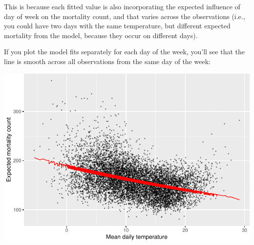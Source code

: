 \documentclass[
]{book}
\newenvironment{Shaded}{\begin{snugshade}}{\end{snugshade}}
\newcommand{\AttributeTok}[1]{\textcolor[rgb]{0.77,0.63,0.00}{#1}}
\newcommand{\FloatTok}[1]{\textcolor[rgb]{0.00,0.00,0.81}{#1}}
\newcommand{\FunctionTok}[1]{\textcolor[rgb]{0.00,0.00,0.00}{#1}}
\newcommand{\NormalTok}[1]{#1}
\newcommand{\SpecialCharTok}[1]{\textcolor[rgb]{0.00,0.00,0.00}{#1}}
\newcommand{\StringTok}[1]{\textcolor[rgb]{0.31,0.60,0.02}{#1}}
\begin{document}
This is because each fitted value is also incorporating the expected influence
of day of week on the mortality count, and that varies across the observations
(i.e., you could have two days with the same temperature, but different
expected mortality from the model, because they occur on different days).

If you plot the model fits separately for each day of the week, you'll see that
the line is smooth across all observations from the same day of the week:

\begin{Shaded}
\end{Shaded}

\includegraphics{adv_epi_analysis_files/figure-latex/unnamed-chunk-40-1.pdf}
\end{document}
